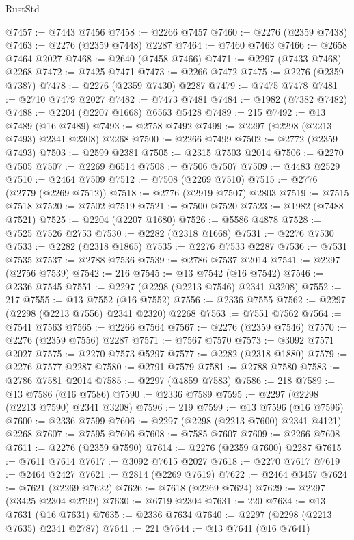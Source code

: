 \begin{lexlean}{RustStd}
\begin{coremodule}
{\begin{coremodule}
{{{{{{{{{{{{{{{{{{{{{{{{{{{{{{{{{{{{{{{{{{{{{{{{{{{{{{@7457 := @7443 @7456
@7458 := @2266 @7457
@7460 := @2276 (@2359 @7438)
@7463 := @2276 (@2359 @7448) @2287
@7464 := @7460 @7463
@7466 := @2658 @7464 @2027
@7468 := @2640 (@7458 @7466)
@7471 := @2297 (@7433 @7468) @2268
@7472 := @7425 @7471
@7473 := @2266 @7472
@7475 := @2276 (@2359 @7387)
@7478 := @2276 (@2359 @7430) @2287
@7479 := @7475 @7478
@7481 := @2710 @7479 @2027
@7482 := @7473 @7481
@7484 := @1982 (@7382 @7482)
@7488 := @2204 (@2207 @1668) @6563 @5428
@7489 := 215
@7492 := @13 @7489 (@16 @7489)
@7493 := @2758 @7492
@7499 := @2297 (@2298 (@2213 @7493) @2341 @2308) @2268
@7500 := @2266 @7499
@7502 := @2772 (@2359 @7493)
@7503 := @2599 @2381
@7505 := @2315 @7503 @2014
@7506 := @2270 @7505
@7507 := @2269 @6514
@7508 := @7506 @7507
@7509 := @4483 @2529
@7510 := @2464 @7509
@7512 := @7508 (@2269 @7510)
@7515 := @2776 (@2779 (@2269 @7512))
@7518 := @2776 (@2919 @7507) @2803
@7519 := @7515 @7518
@7520 := @7502 @7519
@7521 := @7500 @7520
@7523 := @1982 (@7488 @7521)
@7525 := @2204 (@2207 @1680)
@7526 := @5586 @4878
@7528 := @7525 @7526 @2753
@7530 := @2282 (@2318 @1668)
@7531 := @2276 @7530
@7533 := @2282 (@2318 @1865)
@7535 := @2276 @7533 @2287
@7536 := @7531 @7535
@7537 := @2788 @7536
@7539 := @2786 @7537 @2014
@7541 := @2297 (@2756 @7539)
@7542 := 216
@7545 := @13 @7542 (@16 @7542)
@7546 := @2336 @7545
@7551 := @2297 (@2298 (@2213 @7546) @2341 @3208)
@7552 := 217
@7555 := @13 @7552 (@16 @7552)
@7556 := @2336 @7555
@7562 := @2297 (@2298 (@2213 @7556) @2341 @2320) @2268
@7563 := @7551 @7562
@7564 := @7541 @7563
@7565 := @2266 @7564
@7567 := @2276 (@2359 @7546)
@7570 := @2276 (@2359 @7556) @2287
@7571 := @7567 @7570
@7573 := @3092 @7571 @2027
@7575 := @2270 @7573 @5297
@7577 := @2282 (@2318 @1880)
@7579 := @2276 @7577 @2287
@7580 := @2791 @7579
@7581 := @2788 @7580
@7583 := @2786 @7581 @2014
@7585 := @2297 (@4859 @7583)
@7586 := 218
@7589 := @13 @7586 (@16 @7586)
@7590 := @2336 @7589
@7595 := @2297 (@2298 (@2213 @7590) @2341 @3208)
@7596 := 219
@7599 := @13 @7596 (@16 @7596)
@7600 := @2336 @7599
@7606 := @2297 (@2298 (@2213 @7600) @2341 @4121) @2268
@7607 := @7595 @7606
@7608 := @7585 @7607
@7609 := @2266 @7608
@7611 := @2276 (@2359 @7590)
@7614 := @2276 (@2359 @7600) @2287
@7615 := @7611 @7614
@7617 := @3092 @7615 @2027
@7618 := @2270 @7617
@7619 := @2464 @2427
@7621 := @2814 (@2269 @7619)
@7622 := @2464 @3457
@7624 := @7621 (@2269 @7622)
@7626 := @7618 (@2269 @7624)
@7629 := @2297 (@3425 @2304 @2799)
@7630 := @6719 @2304
@7631 := 220
@7634 := @13 @7631 (@16 @7631)
@7635 := @2336 @7634
@7640 := @2297 (@2298 (@2213 @7635) @2341 @2787)
@7641 := 221
@7644 := @13 @7641 (@16 @7641)
}}}}}}}}}}}}}}}}}}}}}}}}}}}}}}}}}}}}}}}}}}}}}}}}}}}}}}
\end{coremodule}}
\end{coremodule}
\end{lexlean}
